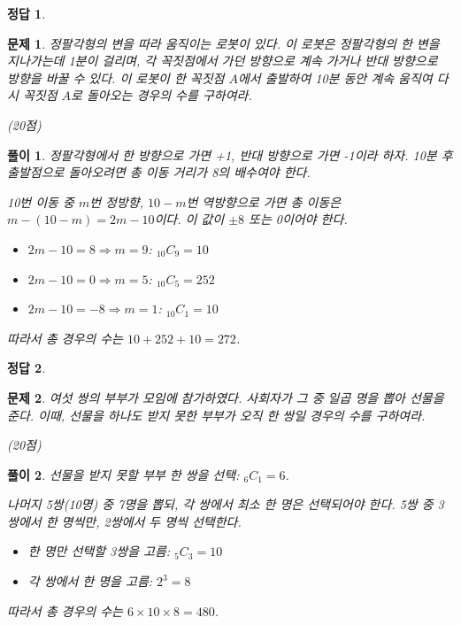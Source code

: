 \documentclass[12pt,a4paper]{article}
\theoremstyle{test_form}
\newtheorem{problem}{문제}[section]
\newtheorem*{solution}{풀이}
\newtheorem*{answer}{정답}
\begin{document}
\begin{answer}
\hfill {}
\end{answer}

\newpage

\begin{problem}
정팔각형의 변을 따라 움직이는 로봇이 있다. 이 로봇은 정팔각형의 한 변을 지나가는데 1분이 걸리며, 각 꼭짓점에서 가던 방향으로 계속 가거나 반대 방향으로 방향을 바꿀 수 있다. 이 로봇이 한 꼭짓점 \(A\)에서 출발하여 10분 동안 계속 움직여 다시 꼭짓점 \(A\)로 돌아오는 경우의 수를 구하여라.
\begin{flushright}(20점)\end{flushright}
\end{problem}

\begin{solution}
정팔각형에서 한 방향으로 가면 +1, 반대 방향으로 가면 -1이라 하자. 10분 후 출발점으로 돌아오려면 총 이동 거리가 8의 배수여야 한다.

10번 이동 중 \(m\)번 정방향, \(10-m\)번 역방향으로 가면 총 이동은 \(m-(10-m)=2m-10\)이다. 이 값이 \(\pm8\) 또는 0이어야 한다.

\begin{itemize}
\item \(2m-10=8 \Rightarrow m=9\): \(_{10}C_9=10\)
\item \(2m-10=0 \Rightarrow m=5\): \(_{10}C_5=252\)
\item \(2m-10=-8 \Rightarrow m=1\): \(_{10}C_1=10\)
\end{itemize}

따라서 총 경우의 수는 \(10+252+10=272\).
\end{solution}

\begin{answer}
\hfill {}
\end{answer}

\newpage

\begin{problem}
여섯 쌍의 부부가 모임에 참가하였다. 사회자가 그 중 일곱 명을 뽑아 선물을 준다. 이때, 선물을 하나도 받지 못한 부부가 오직 한 쌍일 경우의 수를 구하여라.
\begin{flushright}(20점)\end{flushright}
\end{problem}

\begin{solution}
선물을 받지 못할 부부 한 쌍을 선택: \(_6C_1=6\).

나머지 5쌍(10명) 중 7명을 뽑되, 각 쌍에서 최소 한 명은 선택되어야 한다. 5쌍 중 3쌍에서 한 명씩만, 2쌍에서 두 명씩 선택한다.

\begin{itemize}
\item 한 명만 선택할 3쌍을 고름: \(_5C_3=10\)
\item 각 쌍에서 한 명을 고름: \(2^3=8\)
\end{itemize}

따라서 총 경우의 수는 \(6 \times 10 \times 8 = 480\).
\end{solution}
\end{document}
